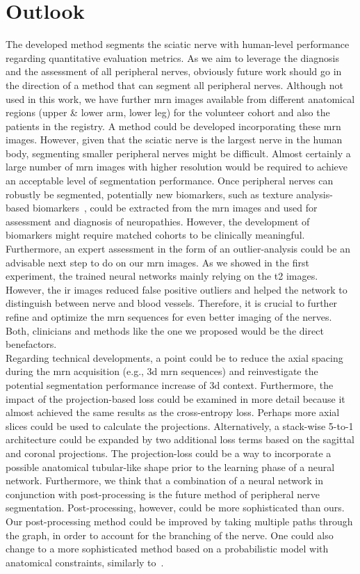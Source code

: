 \chapter{Outlook} \label{chap:outlook}
The developed method segments the sciatic nerve with human-level performance regarding quantitative evaluation metrics. As we aim to leverage the diagnosis and the assessment of all peripheral nerves, obviously future work should go in the direction of a method that can segment all peripheral nerves. Although not used in this work, we have further \gls{mrn} images available from different anatomical regions (upper \& lower arm, lower leg) for the volunteer cohort and also the patients in the registry. A method could be developed incorporating these \gls{mrn} images. However, given that the sciatic nerve is the largest nerve in the human body, segmenting smaller peripheral nerves might be difficult. Almost certainly a large number of \gls{mrn} images with higher resolution would be required to achieve an acceptable level of segmentation performance. Once peripheral nerves can robustly be segmented, potentially new biomarkers, such as texture analysis-based biomarkers~\cite{FelisazTextureNeuropathy}, could be extracted from the \gls{mrn} images and used for assessment and diagnosis of neuropathies. However, the development of biomarkers might require matched cohorts to be clinically meaningful. Furthermore, an expert assessment in the form of an outlier-analysis could be an advisable next step to do on our \gls{mrn} images. As we showed in the first experiment, the trained neural networks mainly relying on the \gls{t2} images. However, the \gls{ir} images reduced false positive outliers and helped the network to distinguish between nerve and blood vessels. Therefore, it is crucial to further refine and optimize the \gls{mrn} sequences for even better imaging of the nerves. Both, clinicians and methods like the one we proposed would be the direct benefactors.\\
Regarding technical developments, a point could be to reduce the axial spacing during the \gls{mrn} acquisition (e.g., \gls{3d} \gls{mrn} sequences) and reinvestigate the potential segmentation performance increase of \gls{3d} context.
Furthermore, the impact of the projection-based loss could be examined in more detail because it almost achieved the same results as the cross-entropy loss. Perhaps more axial slices could be used to calculate the projections. Alternatively, a stack-wise 5-to-1 architecture could be expanded by two additional loss terms based on the sagittal and coronal projections. The projection-loss could be a way to incorporate a possible anatomical tubular-like shape prior to the learning phase of a neural network. Furthermore, we think that a combination of a neural network in conjunction with post-processing is the future method of peripheral nerve segmentation. Post-processing, however, could be more sophisticated than ours. Our post-processing method could be improved by taking multiple paths through the graph, in order to account for the branching of the nerve. One could also change to a more sophisticated method based on a probabilistic model with anatomical constraints, similarly to~\cite{Rempfler2015ReconstructingProgramming}.
\endinput